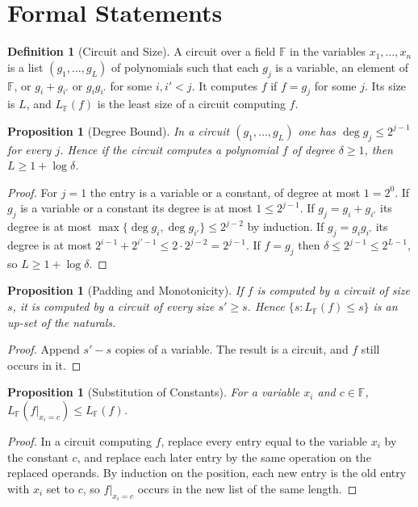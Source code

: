 \documentclass[11pt,letterpaper]{report}
\theoremstyle{plain}
\newtheorem{proposition}[theorem]{Proposition}
\theoremstyle{definition}
\newtheorem{definition}[theorem]{Definition}
\theoremstyle{remark}
\begin{document}
\section{Formal Statements}

\begin{definition}[Circuit and Size]\label{def:circuitlist}
A circuit over a field $\mathbb F$ in the variables $x_1,\dots,x_n$ is a list $(g_1,\dots,g_L)$ of polynomials such that each $g_j$ is a variable, an element of $\mathbb F$, or $g_i+g_{i'}$ or $g_ig_{i'}$ for some $i,i'<j$. It computes $f$ if $f=g_j$ for some $j$. Its size is $L$, and $L_{\mathbb F}(f)$ is the least size of a circuit computing $f$.
\end{definition}

\begin{proposition}[Degree Bound]\label{pr:degbound}
In a circuit $(g_1,\dots,g_L)$ one has $\deg g_j\le2^{j-1}$ for every $j$. Hence if the circuit computes a polynomial $f$ of degree $\delta\ge1$, then $L\ge1+\log\delta$.
\end{proposition}
\begin{proof}
For $j=1$ the entry is a variable or a constant, of degree at most $1=2^0$. If $g_j$ is a variable or a constant its degree is at most $1\le2^{j-1}$. If $g_j=g_i+g_{i'}$ its degree is at most $\max\{\deg g_i,\deg g_{i'}\}\le2^{j-2}$ by induction. If $g_j=g_ig_{i'}$ its degree is at most $2^{i-1}+2^{i'-1}\le2\cdot2^{j-2}=2^{j-1}$. If $f=g_j$ then $\delta\le2^{j-1}\le2^{L-1}$, so $L\ge1+\log\delta$.
\end{proof}

\begin{proposition}[Padding and Monotonicity]\label{pr:padding}
If $f$ is computed by a circuit of size $s$, it is computed by a circuit of every size $s'\ge s$. Hence $\{s:L_{\mathbb F}(f)\le s\}$ is an up-set of the naturals.
\end{proposition}
\begin{proof}
Append $s'-s$ copies of a variable. The result is a circuit, and $f$ still occurs in it.
\end{proof}

\begin{proposition}[Substitution of Constants]\label{pr:subst}
For a variable $x_i$ and $c\in\mathbb F$, $L_{\mathbb F}(f|_{x_i=c})\le L_{\mathbb F}(f)$.
\end{proposition}
\begin{proof}
In a circuit computing $f$, replace every entry equal to the variable $x_i$ by the constant $c$, and replace each later entry by the same operation on the replaced operands. By induction on the position, each new entry is the old entry with $x_i$ set to $c$, so $f|_{x_i=c}$ occurs in the new list of the same length.
\end{proof}
\end{document}
